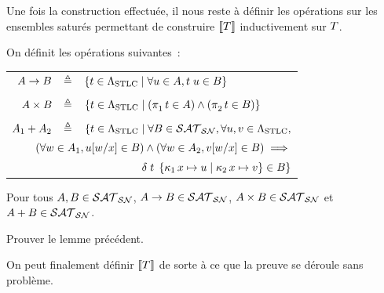 Une fois la construction effectuée, il nous reste à définir les opérations
sur les ensembles saturés permettant de construire $\llbracket T\rrbracket$
inductivement sur $T$.

\begin{definition}
  On définit les opérations suivantes~:
  \begin{center}
    \begin{tabular}{rcl}
      $A \to B$ &$\triangleq$&
      $\left\{ t \in \Lambda_{\mathrm{STLC}} \;\middle\vert\; \forall u \in A, t\;u \in B \right\}$\\\\
      $A \times B$ &$\triangleq$&
      $\left\{ t \in \Lambda_{\mathrm{STLC}} \;\middle\vert\; (\mathop{\pi_{1}^{}} t \in A)\land
        (\mathop{\pi_{2}^{}} t\in B) \right\}$ \\\\
      $A_1 + A_2$ &$\triangleq$&
      $\{ t \in \Lambda_{\mathrm{STLC}} \mid \forall B \in \mathcal{SAT}_{\mathcal{SN}},
      \forall u,v \in \Lambda_{\mathrm{STLC}},$\\
      \multicolumn{3}{r}{
        $(\forall w \in A_1,u[w/x] \in B) \land
        (\forall w \in A_2,v[w/x] \in B) \implies$
      }\\
      \multicolumn{3}{r}{$\delta\;t\;\left\{\mathop{\kappa_{1}} x\mapsto u \;\middle\vert\; \mathop{\kappa_{2}} x\mapsto v\right\} \in B \}$}
    \end{tabular}
  \end{center}
  \index[notation]{$\satTO$}
  \index[notation]{$\satAND$}
  \index[notation]{$\satOR$}
\end{definition}

\begin{lemma}
  Pour tous $A,B \in \mathcal{SAT}_{\mathcal{SN}}$,
  $A\to B \in \mathcal{SAT}_{\mathcal{SN}}$,
  $A\times B \in \mathcal{SAT}_{\mathcal{SN}}$ et $A+ B \in \mathcal{SAT}_{\mathcal{SN}}$.
\end{lemma}

\begin{exercise}
  Prouver le lemme précédent.
\end{exercise}

On peut finalement définir $\llbracket T\rrbracket$ de sorte à ce que la preuve se
déroule sans problème.


